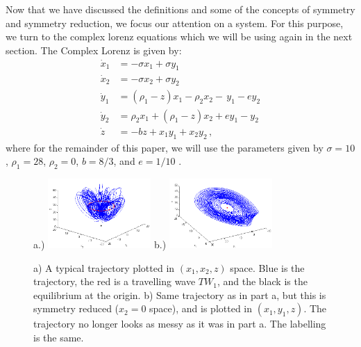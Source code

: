 \documentclass[aip,cha,reprint,
secnumarabic,
nofootinbib, tightenlines,
nobibnotes, showkeys, showpacs,
groupedaddress
]{revtex4-1}
\begin{document}
Now that we have discussed the definitions and some of the concepts of symmetry and symmetry reduction, we focus our attention on a system.  For this purpose, we turn to the complex lorenz equations which we will be using again in the next section. The Complex Lorenz is given by:
\begin{equation}
\begin{split}
  \dot x_1 &= -\sigma x_1  + \sigma y_1 \\
  \dot x_2 &=  -\sigma x_2  + \sigma y_2 \\
  \dot y_1 &= (\rho_1  -  z)x_1  -  \rho_2x_2  - \, y_1  - ey_2 \\
  \dot y_2 &= \rho_2x_1  +  (\rho_1  -  z)x_2  +  ey_1  -  y_2 \\
  \dot z &= -bz  + x_1y_1+x_2y_2 \,,
  \label{eq:CLE}
\end{split}
\end{equation}
where for the remainder of this paper, we will use the parameters given by $\sigma = 10$, $\rho_1 = 28$, $\rho_2 = 0$, $b = 8/3$, and $e = 1/10$ \cite{Eth}.
\begin{figure}[h]
\centering
a.)  \includegraphics[width=0.35\textwidth]{Figs/Section2/kcCLEaxisonc.png}
b.)
  \includegraphics[width=0.35\textwidth]{Figs/Section2/kcCLEredaxisonc.png}
\caption{
a) A typical trajectory plotted in $(x_1, x_2, z)$ space.  Blue is the trajectory, the red is a travelling wave $TW_1$, and the black is the equilibrium at the origin.
b) Same trajectory as in part a, but this is symmetry reduced ($x_2 = 0$ space), and is plotted in $(x_1, y_1, z)$.  The trajectory no longer looks as messy as it was in part a.  The labelling is the same.
}
 \label{fig:CLETraj}
\end{figure}
\end{document}
